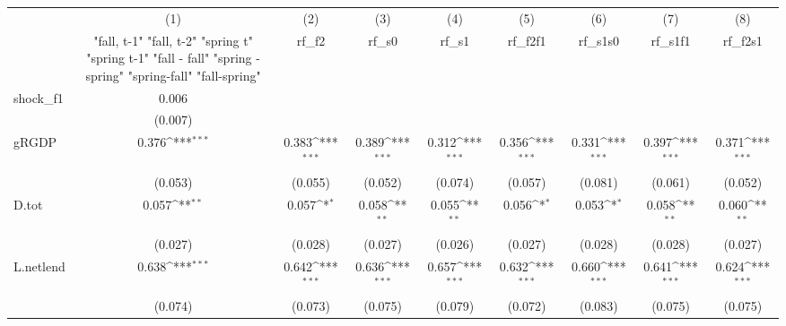 {
\def\sym#1{\ifmmode^{#1}\else\(^{#1}\)\fi}
\begin{tabular}{l*{8}{c}}
\toprule
            &\multicolumn{1}{c}{(1)}&\multicolumn{1}{c}{(2)}&\multicolumn{1}{c}{(3)}&\multicolumn{1}{c}{(4)}&\multicolumn{1}{c}{(5)}&\multicolumn{1}{c}{(6)}&\multicolumn{1}{c}{(7)}&\multicolumn{1}{c}{(8)}\\
            &\multicolumn{1}{c}{  "fall, t-1" "fall, t-2" "spring t" "spring t-1"  "fall - fall" "spring - spring" "spring-fall" "fall-spring" }&\multicolumn{1}{c}{rf\_f2}&\multicolumn{1}{c}{rf\_s0}&\multicolumn{1}{c}{rf\_s1}&\multicolumn{1}{c}{rf\_f2f1}&\multicolumn{1}{c}{rf\_s1s0}&\multicolumn{1}{c}{rf\_s1f1}&\multicolumn{1}{c}{rf\_f2s1}\\
\midrule
shock\_f1    &       0.006         &                     &                     &                     &                     &                     &                     &                     \\
            &     (0.007)         &                     &                     &                     &                     &                     &                     &                     \\
\addlinespace
gRGDP       &       0.376\sym{***}&       0.383\sym{***}&       0.389\sym{***}&       0.312\sym{***}&       0.356\sym{***}&       0.331\sym{***}&       0.397\sym{***}&       0.371\sym{***}\\
            &     (0.053)         &     (0.055)         &     (0.052)         &     (0.074)         &     (0.057)         &     (0.081)         &     (0.061)         &     (0.052)         \\
\addlinespace
D.tot       &       0.057\sym{**} &       0.057\sym{*}  &       0.058\sym{**} &       0.055\sym{**} &       0.056\sym{*}  &       0.053\sym{*}  &       0.058\sym{**} &       0.060\sym{**} \\
            &     (0.027)         &     (0.028)         &     (0.027)         &     (0.026)         &     (0.027)         &     (0.028)         &     (0.028)         &     (0.027)         \\
\addlinespace
L.netlend   &       0.638\sym{***}&       0.642\sym{***}&       0.636\sym{***}&       0.657\sym{***}&       0.632\sym{***}&       0.660\sym{***}&       0.641\sym{***}&       0.624\sym{***}\\
            &     (0.074)         &     (0.073)         &     (0.075)         &     (0.079)         &     (0.072)         &     (0.083)         &     (0.075)         &     (0.075)         \\

\end{tabular}}
